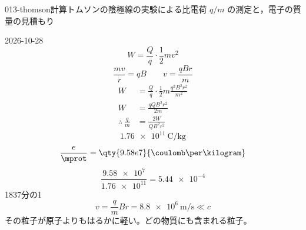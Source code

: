 \documentclass[uplatex,dvipdfmx,a4paper,11pt]{jsarticle}
\begin{document}
\begin{mondai}{013-thomson}{計算}{トムソンの陰極線の実験による比電荷 $q/m$ の測定と，電子の質量の見積もり}
\begin{shoumon}
  \end{shoumon}
\begin{kotaeutsushi}{2026-10-28}
\[ W=\frac{Q}{q}\cdot\frac{1}{2}mv^{2} \]
\[ \frac{mv}{r}=qB\qquad v=\frac{qBr}{m} \]
\begin{align*}
  W&=\frac{Q}{q}\cdot\frac{1}{2}m\frac{q^{2}B^{2}r^{2}}{m^{2}}\\
  W&=\frac{qQB^{2}r^{2}}{2m}\\
  \therefore\ \frac{q}{m}&=\frac{2W}{QB^{2}r^{2}}
\end{align*}
\[ \qty{1.76e11}{\coulomb\per\kilogram} \]
\[ \frac{e}{\mprot}=\qty{9.58e7}{\coulomb\per\kilogram} \]
\[ \frac{\num{9.58e7}}{\num{1.76e11}}=\num{5.44e-4} \]
1837分の1
\[ v=\frac{q}{m}Br=\qty{8.8e6}{\metre\per\second}\ll c \]
その粒子が原子よりもはるかに軽い。どの物質にも含まれる粒子。
\end{kotaeutsushi}
\end{mondai}
\end{document}

